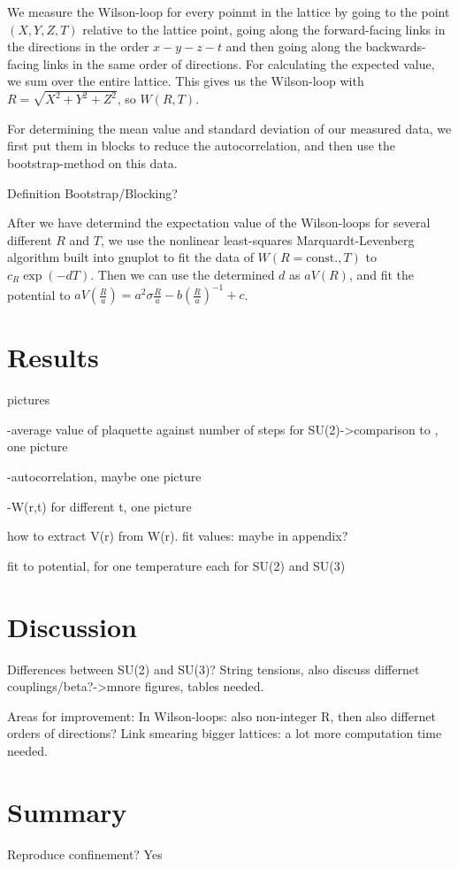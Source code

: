 \documentclass[%
 reprint,
 amsmath,amssymb,
 aps,
]{revtex4-1}
\begin{document}

We measure the Wilson-loop for every poinmt in the lattice by going to the point $(X,Y,Z,T)$ relative to the lattice point, going along the forward-facing links in the directions in the order $x-y-z-t$ and then going along the backwards-facing links in the same order of directions. For calculating the expected value, we sum over the entire lattice. This gives us the Wilson-loop with $R=\sqrt{X^2+Y^2+Z^2}$, so $W(R, T)$.

For determining the mean value and standard deviation of our measured data, we first put them in blocks to reduce the autocorrelation, and then use the bootstrap-method on this data.

Definition Bootstrap/Blocking? 

After we have determind the expectation value of the Wilson-loops for several different $R$ and $T$, we use the nonlinear least-squares Marquardt-Levenberg algorithm built into gnuplot to fit the data of $W(R=\text{const.}, T)$ to $c_R\exp(-dT)$. Then we can use the determined $d$ as $aV(R)$, and fit the potential to $aV\left(\frac{R}{a}\right)=a^2\sigma \frac{R}{a}-b\left(\frac{R}{a}\right)^{-1}+c$.

\section{Results}

pictures
%

-average value of plaquette against number of steps for SU(2)->comparison to \citet{creutzsu2}, one picture

-autocorrelation, maybe one picture

-W(r,t) for different t, one picture

how to extract V(r) from W(r). fit values: maybe in appendix?

fit to potential, for one temperature each for SU(2) and SU(3)

\section{Discussion}

Differences between SU(2) and SU(3)? 
String tensions, also discuss differnet couplings/beta?->mnore figures, tables needed.

Areas for improvement: In Wilson-loops: also non-integer R, then also differnet orders of directions?
Link smearing
bigger lattices: a lot more computation time needed.

\section{Summary}

Reproduce confinement? Yes


\end{document}
